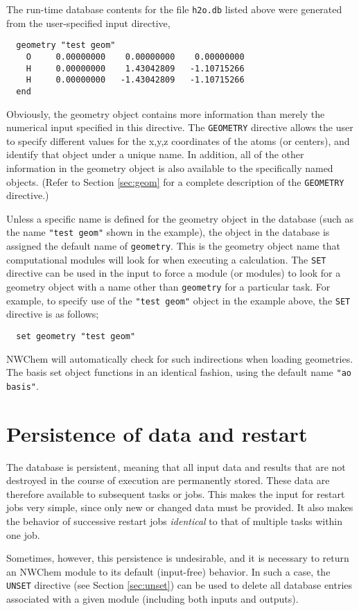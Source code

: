 The run-time database contents for the file \verb+h2o.db+ listed 
above were generated from the user-specified input directive,
\begin{verbatim}
  geometry "test geom"
    O     0.00000000    0.00000000    0.00000000
    H     0.00000000    1.43042809   -1.10715266
    H     0.00000000   -1.43042809   -1.10715266
  end
\end{verbatim}

Obviously, the geometry object contains more information than merely the
numerical input specified in this directive.  The \verb+GEOMETRY+
directive allows the user to specify different values for the x,y,z
coordinates of the atoms (or centers), and identify that object under
a unique name.  In addition, all of the other information in the 
geometry object is also available
to the specifically named objects.  (Refer to Section
\ref{sec:geom} for a complete description of the {\tt GEOMETRY}
directive.)

Unless a specific name is defined for the geometry object in the
database (such as the name \verb+"test geom"+ shown in the
example), the object in the database is assigned the default name of
\verb+geometry+.  This is the geometry object name that computational
modules will look for when executing a calculation.  The {\tt SET}
directive can be used in the input to force a module (or modules) to
look for a geometry object with a name other than \verb+geometry+
for a particular task.  For example, to specify use of the 
\verb+"test geom"+ object in the example above, the \verb+SET+
directive is as follows;

\begin{verbatim}
  set geometry "test geom"
\end{verbatim}

NWChem will automatically check for such indirections when loading
geometries.  The basis set object functions in an identical fashion,
using the default name \verb+"ao basis"+.

\section{Persistence of data and restart}
\label{sec:persist}

The database is persistent, meaning that all input data and results
that are not destroyed in the course of execution are permanently
stored.  These data are therefore available to subsequent tasks or
jobs.  This makes the input for restart jobs very simple, since only
new or changed data must be provided.  It also makes the behavior of
successive restart jobs {\em identical} to that of multiple tasks
within one job.  

Sometimes, however, this persistence is undesirable, and it is
necessary to return an NWChem module to its default (input-free)
behavior. In such a case, the \verb+UNSET+ directive (see Section
\ref{sec:unset}) can be used to delete all database entries associated
with a given module (including both inputs and outputs).
